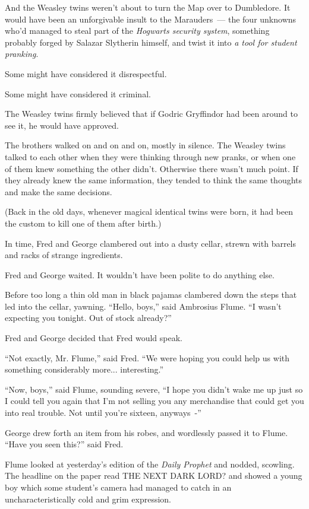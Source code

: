 And the Weasley twins weren't about to turn the Map over to Dumbledore. It would have been an unforgivable insult to the Marauders~--- the four unknowns who'd managed to steal part of the \emph{Hogwarts security system}, something probably forged by Salazar Slytherin himself, and twist it into \emph{a tool for student pranking}.

Some might have considered it disrespectful.

Some might have considered it criminal.

The Weasley twins firmly believed that if Godric Gryffindor had been around to see it, he would have approved.

The brothers walked on and on and on, mostly in silence. The Weasley twins talked to each other when they were thinking through new pranks, or when one of them knew something the other didn't. Otherwise there wasn't much point. If they already knew the same information, they tended to think the same thoughts and make the same decisions.

(Back in the old days, whenever magical identical twins were born, it had been the custom to kill one of them after birth.)

In time, Fred and George clambered out into a dusty cellar, strewn with barrels and racks of strange ingredients.

Fred and George waited. It wouldn't have been polite to do anything else.

Before too long a thin old man in black pajamas clambered down the steps that led into the cellar, yawning. ``Hello, boys,'' said Ambrosius Flume. ``I wasn't expecting you tonight. Out of stock already?''

Fred and George decided that Fred would speak.

``Not exactly, Mr. Flume,'' said Fred. ``We were hoping you could help us with something considerably more... interesting.''

``Now, boys,'' said Flume, sounding severe, ``I hope you didn't wake me up just so I could tell you again that I'm not selling you any merchandise that could get you into real trouble. Not until you're sixteen, anyways~-''

George drew forth an item from his robes, and wordlessly passed it to Flume. ``Have you seen this?'' said Fred.

Flume looked at yesterday's edition of the \emph{Daily Prophet} and nodded, scowling. The headline on the paper read THE NEXT DARK LORD? and showed a young boy which some student's camera had managed to catch in an uncharacteristically cold and grim expression.

